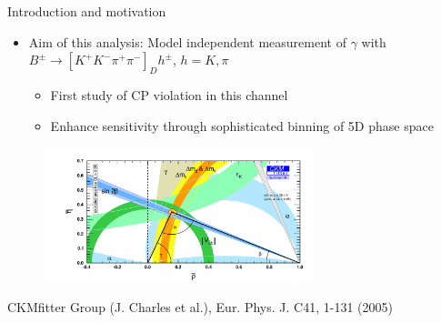 \documentclass{beamer}
\begin{document}
\begin{frame}{Introduction and motivation}
  \begin{itemize}
    \setlength\itemsep{1.2em}
    \item{Aim of this analysis: Model independent measurement of $\gamma$ with $B^\pm\to[K^+K^-\pi^+\pi^-]_D h^\pm$, $h = K, \pi$}
    \begin{itemize}
      \setlength\itemsep{0.5em}
      \item{First study of CP violation in this channel}
      \item{Enhance sensitivity through sophisticated binning of 5D phase space}
    \end{itemize}
  \end{itemize}
  \vspace{-0.2cm}
  \begin{figure}
    \includegraphics[width = 0.70\textwidth]{Plots/ckmfitter2.pdf}
  \end{figure}
  \vspace{-0.5cm}
  \begin{center}
    \tiny{CKMfitter Group (J. Charles et al.), Eur. Phys. J. C41, 1-131 (2005)}
  \end{center}
\end{frame}
\end{document}
